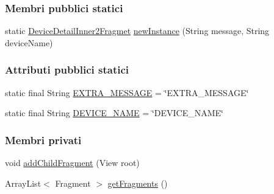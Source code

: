 \subsubsection*{Membri pubblici statici}
\begin{DoxyCompactItemize}
\item 
static \hyperlink{classit_1_1unibo_1_1torsello_1_1bluetoothpositioning_1_1fragment_1_1DeviceDetailInner2Fragmet}{Device\+Detail\+Inner2\+Fragmet} \hyperlink{classit_1_1unibo_1_1torsello_1_1bluetoothpositioning_1_1fragment_1_1DeviceDetailInner2Fragmet_a80972a8f816dc07e8844bea60b2438e1_a80972a8f816dc07e8844bea60b2438e1}{new\+Instance} (String message, String device\+Name)
\end{DoxyCompactItemize}
\subsubsection*{Attributi pubblici statici}
\begin{DoxyCompactItemize}
\item 
static final String \hyperlink{classit_1_1unibo_1_1torsello_1_1bluetoothpositioning_1_1fragment_1_1DeviceDetailInner2Fragmet_a2980d3d81aa246caa72f182a8c2ccb11_a2980d3d81aa246caa72f182a8c2ccb11}{E\+X\+T\+R\+A\+\_\+\+M\+E\+S\+S\+A\+GE} = \char`\"{}E\+X\+T\+R\+A\+\_\+\+M\+E\+S\+S\+A\+GE\char`\"{}
\item 
static final String \hyperlink{classit_1_1unibo_1_1torsello_1_1bluetoothpositioning_1_1fragment_1_1DeviceDetailInner2Fragmet_a8e8968fb34c3ad56d582196879b0ef6c_a8e8968fb34c3ad56d582196879b0ef6c}{D\+E\+V\+I\+C\+E\+\_\+\+N\+A\+ME} = \char`\"{}D\+E\+V\+I\+C\+E\+\_\+\+N\+A\+ME\char`\"{}
\end{DoxyCompactItemize}
\subsubsection*{Membri privati}
\begin{DoxyCompactItemize}
\item 
void \hyperlink{classit_1_1unibo_1_1torsello_1_1bluetoothpositioning_1_1fragment_1_1DeviceDetailInner2Fragmet_aa1467621600238fa5efde4a2cee901e0_aa1467621600238fa5efde4a2cee901e0}{add\+Child\+Fragment} (View root)
\item 
Array\+List$<$ Fragment $>$ \hyperlink{classit_1_1unibo_1_1torsello_1_1bluetoothpositioning_1_1fragment_1_1DeviceDetailInner2Fragmet_adc5cddae8abe48105c75060b99937b62_adc5cddae8abe48105c75060b99937b62}{get\+Fragments} ()
\end{DoxyCompactItemize}
